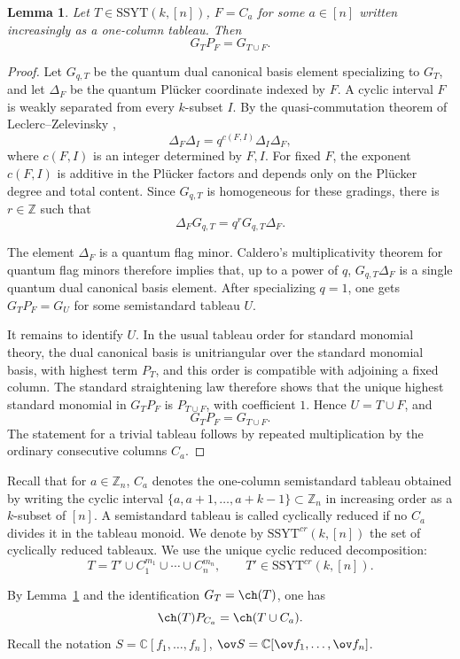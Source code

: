 \documentclass[11pt]{amsart}
\numberwithin{equation}{section}
\newtheorem{lem}[thm]{Lemma}
\newcommand{\bC}{{\mathbb C}}
\newcommand{\bZ}{{\mathbb Z}}
\newcommand{\SSYT}{\mathrm{SSYT}}
\begin{document}
\begin{lem}\label{lem:GP}
Let $T\in \SSYT(k,[n])$, $F=C_a$ for some $a\in [n]$ 
written increasingly as a one-column tableau. Then
\[
G_TP_F=G_{T\cup F}.
\]
\end{lem}
\begin{proof}
Let $G_{q,T}$ be the quantum dual canonical basis element specializing to $G_T$, 
and let $\Delta_F$ be the quantum Pl\"ucker coordinate indexed by $F$.  A cyclic 
interval $F$ is weakly separated from every $k$-subset $I$.  By the
quasi-commutation theorem of Leclerc--Zelevinsky
\cite{LZ98},
\[
\Delta_F\Delta_I=q^{c(F,I)}\Delta_I\Delta_F,
\]
where $c(F,I)$ is an integer determined by $F,I$. For fixed $F$, the exponent $c(F,I)$ is additive in the Pl\"ucker factors and depends only on the Pl\"ucker degree and total content.
Since $G_{q,T}$ is homogeneous for these gradings, there is
$r\in\bZ$ such that
\[
\Delta_FG_{q,T}=q^rG_{q,T}\Delta_F.
\]

The element $\Delta_F$ is a quantum flag minor.  Caldero's
multiplicativity theorem for quantum flag minors
\cite{Cal03} therefore implies that, up to a power of $q$,
$G_{q,T}\Delta_F$ is a single quantum dual canonical basis element.
After specializing $q=1$, one gets $G_TP_F=G_U$ for some semistandard tableau $U$.

It remains to identify $U$.  In the usual tableau order for standard
monomial theory, the dual canonical basis is unitriangular over the
standard monomial basis, with highest term $P_T$, and this order is
compatible with adjoining a fixed column.  The standard straightening
law therefore shows that the unique highest standard monomial in
$G_TP_F$ is $P_{T\cup F}$, with coefficient $1$.  Hence
$U=T\cup F$, and
\[
G_TP_F=G_{T\cup F}.
\]
The statement for a trivial tableau follows by repeated multiplication
by the ordinary consecutive columns $C_a$.
\end{proof}

Recall that for $a\in\bZ_n$,  $C_a$ 
denotes the one-column semistandard tableau obtained by writing the
cyclic interval $\{a,a+1,\ldots,a+k-1\}\subset\bZ_n$
in increasing order as a $k$-subset of $[n]$.   A
semistandard tableau is called cyclically reduced if no $C_a$
divides it in the tableau monoid. We denote by $\SSYT^{cr}(k,[n])$
the set of cyclically reduced tableaux.  We use the unique cyclic
reduced decomposition:
\[
T = T'\cup C_1^{m_1}\cup\cdots\cup C_n^{m_n}, \qquad
T'\in\SSYT^{cr}(k,[n]).
\]

By Lemma~\ref{lem:GP} and the identification $G_T=\ch(T)$, one has 
\[
\ch(T)P_{C_a}=\ch(T\cup C_a).
\]
Recall the notation 
$S=\bC[f_1,\dots,f_n]$, $\ov S = \bC[\ov f_1,\dots,\ov f_n]$.
\end{document}
